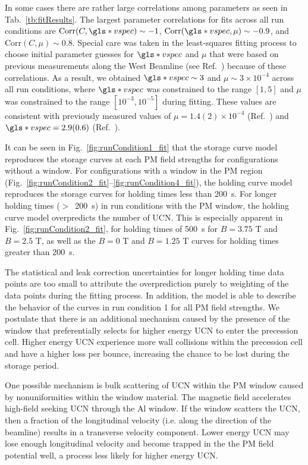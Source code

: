 In some cases there are rather large correlations among parameters as seen in Tab.~\ref{tb:fitResults}. The largest parameter correlations for fits across all run conditions are  $\text{Corr}(C,\gls*{vspec}) \sim -1$, $\text{Corr}(\gls*{vspec},\mu) \sim -0.9$, and $\text{Corr}(C,\mu) \sim 0.8$. Special care was taken in the least-squares fitting process to choose initial parameter guesses for $\gls*{vspec}$ and $\mu$ that were based on previous measurements along the West Beamline (see Ref.~\cite{ito_performance_2018, pattie_jr_evaluation_2017}) because of these correlations. As a result, we obtained $\gls*{vspec} \sim 3$ and $\mu \sim 3\times 10^{-4}$ across all run conditions, where $\gls*{vspec}$ was constrained to the range $[1,5]$ and $\mu$ was constrained to the range $[10^{-3}, 10^{-5}]$ during fitting. These values are consistent with previously measured values of $\mu = 1.4(2)\times 10^{-4}$ (Ref.~\cite{pattie_jr_evaluation_2017}) and $\gls*{vspec} = 2.9(0.6)$ (Ref.~\cite{ito_performance_2018}).

It can be seen in Fig.~\ref{fig:runCondition1_fit} that the storage curve model reproduces the storage curves at each PM field strengths for configurations without a window. For configurations with a window in the PM region (Fig.~\ref{fig:runCondition2_fit}--\ref{fig:runCondition4_fit}), the holding curve model reproduces the storage curves for holding times less than \qty{200}{\s}. For longer holding times ($>$~\qty{200}{\s}) in run conditions with the PM window, the holding curve model overpredicts the number of UCN. This is especially apparent in Fig.~\ref{fig:runCondition2_fit}, for holding times of \qty{500}{\s} for $B=3.75\text{ T}$ and $B=2.5\text{ T}$, as well as the $B=0\text{ T}$ and $B=1.25\text{ T}$ curves for holding times greater than \qty{200}{\s}. 

The statistical and leak correction uncertainties for longer holding time data points are too small to attribute the overprediction purely to weighting of the data points during the fitting process. In addition, the model is able to describe the behavior of the curves in run condition 1 for all PM field strengths.  We postulate that there is an additional mechanism caused by the presence of the window that preferentially selects for higher energy UCN to enter the precession cell. Higher energy UCN experience more wall collisions within the precession cell and have a higher loss per bounce, increasing the chance to be lost during the storage period.

One possible mechanism is bulk scattering of UCN within the PM window caused by nonuniformities within the window material. The magnetic field accelerates high-field seeking UCN through the Al window. If the window scatters the UCN, then a fraction of the longitudinal velocity (i.e. along the direction of the beamline) results in a transverse velocity component. Lower energy UCN may lose enough longitudinal velocity and become trapped in the the PM field potential well, a process less likely for higher energy UCN.

